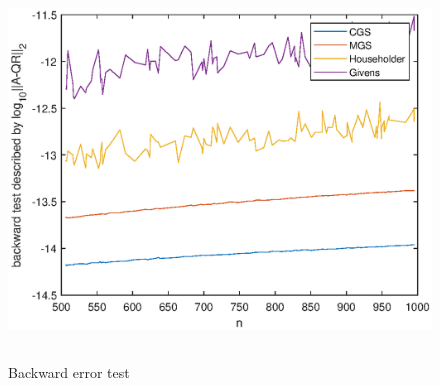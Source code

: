 \documentclass[UTF8,a4paper,10pt]{ctexart}
\begin{document}
    \begin{figure}[ht]
        \centering
        \includegraphics[width=14cm,height=10cm]{1_backward.eps}
        \caption{Backward error test}
    \end{figure}
\end{document}

